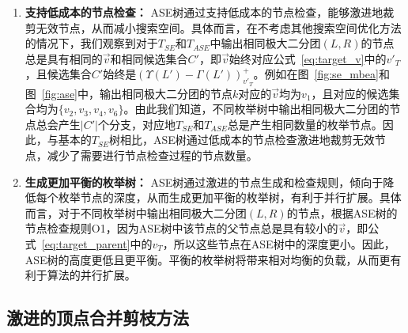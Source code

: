 \begin{enumerate}
  \item \textbf{支持低成本的节点检查：}  ASE树通过支持低成本的节点检查，能够激进地裁剪无效节点，从而减小搜索空间。具体而言，在不考虑其他搜索空间优化方法的情况下，我们观察到对于$T_{SE}$和$T_{ASE}$中输出相同极大二分团$(L,R)$的节点总是具有相同的$\vec{v}$和相同候选集合$C'$，即$\vec{v}$始终对应公式~\ref{eq:target_v}中的$v'_T$，且候选集合$C'$始终是$(\Upsilon(L') - \Gamma(L'))_{v'_T}^+$。例如在图~\ref{fig:se_mbea}和图~\ref{fig:ase}中，输出相同极大二分团的节点$k$对应的$\vec{v}$均为$v_1$，且对应的候选集合均为$\{v_2,v_3,v_4,v_6\}$。由此我们知道，不同枚举树中输出相同极大二分团的节点总会产生$|C'|$个分支，对应地$T_{SE}$和$T_{ASE}$总是产生相同数量的枚举节点。因此，与基本的$T_{SE}$树相比，ASE树通过低成本的节点检查激进地裁剪无效节点，减少了需要进行节点检查过程的节点数量。
  

  \item \textbf{生成更加平衡的枚举树：} ASE树通过激进的节点生成和检查规则，倾向于降低每个枚举节点的深度，从而生成更加平衡的枚举树，有利于并行扩展。具体而言，对于不同枚举树中输出相同极大二分团$(L,R)$的节点，根据ASE树的节点检查规则O1，因为ASE树中该节点的父节点总是具有较小的$\vec{v}$，即公式~\ref{eq:target_parent}中的$v_T$，所以这些节点在ASE树中的深度更小。因此，ASE树的高度更低且更平衡。平衡的枚举树将带来相对均衡的负载，从而更有利于算法的并行扩展。

\end{enumerate}



\subsection{激进的顶点合并剪枝方法}
\label{subsec:amp}


